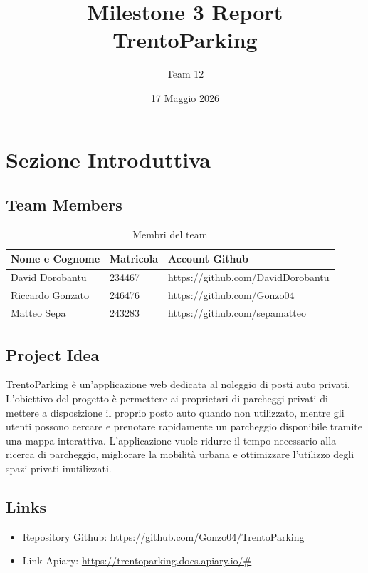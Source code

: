 \documentclass[12pt,a4paper]{article}
\title{\textbf{Milestone 3 Report}\\
TrentoParking}
\author{Team 12}
\date{17 Maggio 2026}
\begin{document}
\maketitle
\tableofcontents
\newpage

\section{Sezione Introduttiva}

\subsection{Team Members}

\begin{table}[H]
\centering
\begin{tabular}{|p{6cm}|p{2.5cm}|p{7cm}|}
\hline
\textbf{Nome e Cognome} & \textbf{Matricola} & \textbf{Account Github} \\
\hline
David Dorobantu & 234467 & https://github.com/DavidDorobantu \\
\hline
Riccardo Gonzato & 246476 & https://github.com/Gonzo04 \\
\hline
Matteo Sepa & 243283 & https://github.com/sepamatteo \\
\hline
\end{tabular}
\caption{Membri del team}
\end{table}

\subsection{Project Idea}

TrentoParking è un'applicazione web dedicata al noleggio di posti auto privati.
L'obiettivo del progetto è permettere ai proprietari di parcheggi privati di mettere a disposizione il proprio posto auto quando non utilizzato, mentre gli utenti possono cercare e prenotare rapidamente un parcheggio disponibile tramite una mappa interattiva.
L'applicazione vuole ridurre il tempo necessario alla ricerca di parcheggio, migliorare la mobilità urbana e ottimizzare l'utilizzo degli spazi privati inutilizzati.

\subsection{Links}

\begin{itemize}
    \item Repository Github: \url{https://github.com/Gonzo04/TrentoParking}
    \item Link Apiary: \url{https://trentoparking.docs.apiary.io/#}
\end{itemize}
\end{document}
